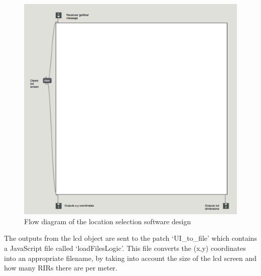 \documentclass[../../main.tex]{subfiles}
\begin{document}
			\begin{figure}[H]
				\centerline{\includegraphics[scale = 0.4]{Sections/Implementation/Max/images/Max/lcd.png}}
				\caption{Flow diagram of the location selection software design}
				\label{lcd}
			\end{figure}

			The outputs from the lcd object are sent to the patch ‘UI_to_file’ which contains a JavaScript file called ‘loadFilesLogic’. This file converts the (x,y) coordinates into an appropriate filename, by taking into account the size of the lcd screen and how many RIRs there are per meter. 
\end{document}
